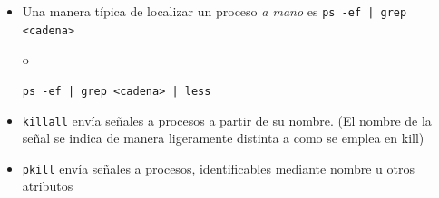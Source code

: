\documentclass[ucs]{beamer}
\begin{document}
\begin{frame}[fragile]
\begin{itemize}
\item
Una manera típica de localizar un proceso \emph{a mano}  es
\verb$ps -ef | grep <cadena>$

o

\verb$ps -ef | grep <cadena> | less$
\item
\verb|killall| envía señales a procesos a partir de su nombre. (El nombre de la señal 
se indica de manera ligeramente distinta a como se emplea en kill)
\item
\verb|pkill| envía señales a procesos, identificables mediante nombre u otros atributos

\end{itemize}

\end{frame}



\end{document}
